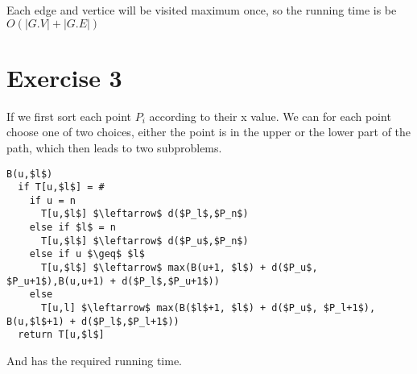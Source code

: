 \documentclass[12pt,a4paper]{report}
\begin{document}
Each edge and vertice will be visited maximum once, so the running time is be $O(|G.V| + |G.E|)$

\section*{Exercise 3}
If we first sort each point $P_i$ according to their x value. We can for each point choose one of two choices, either the point is in the upper or the lower part of the path, which then leads to two subproblems.

\begin{lstlisting}
B(u,$l$)
  if T[u,$l$] = #
    if u = n
  	  T[u,$l$] $\leftarrow$ d($P_l$,$P_n$) 	
    else if $l$ = n
  	  T[u,$l$] $\leftarrow$ d($P_u$,$P_n$)
    else if u $\geq$ $l$
      T[u,$l$] $\leftarrow$ max(B(u+1, $l$) + d($P_u$, $P_u+1$),B(u,u+1) + d($P_l$,$P_u+1$))
    else
      T[u,l] $\leftarrow$ max(B($l$+1, $l$) + d($P_u$, $P_l+1$), B(u,$l$+1) + d($P_l$,$P_l+1$))
  return T[u,$l$]
\end{lstlisting}

And has the required running time.
\end{document}

